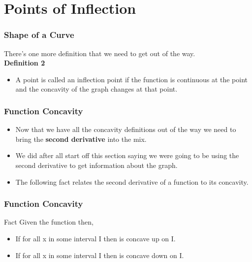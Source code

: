 \documentclass{beamer}
\begin{document}
\section*{Points of Inflection}
\begin{frame} 
	\frametitle{Shape of a Curve}
 There’s one more definition that we need to get out of the way.\\
 
\textbf{Definition 2}
\begin{itemize}
\item A point  is called an inflection point if the function is continuous at the point and the concavity of the graph changes at that point.
\end{itemize}

\end{frame}
\begin{frame} 
	\frametitle{Function Concavity}
	\begin{itemize}
	 \item Now that we have all the concavity definitions out of the way we need to bring the \textbf{second derivative} into the mix.  
	 \item We did after all start off this section saying we were going to be using the second derivative to get information about the graph.  
	 \item The following fact relates the second derivative of a function to its concavity. 
	\end{itemize}

\end{frame}
\begin{frame} 
	\frametitle{Function Concavity}
 Fact
 Given the function  then,
 \begin{itemize}
 \item If  for all x in some interval I then  is concave up on I.
  
 \item If  for all x in some interval I then  is concave down on I.
 \end{itemize}

\end{frame}
\end{document}
